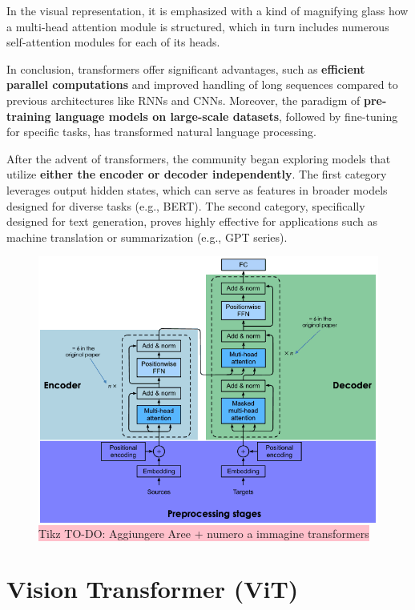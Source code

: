 In the visual representation, it is emphasized with a kind of magnifying glass how a multi-head attention module is structured, which in turn includes numerous self-attention modules for each of its heads.

In conclusion, transformers offer significant advantages, such as \textbf{efficient parallel computations} and improved handling of long sequences compared to previous architectures like RNNs and CNNs. Moreover, the paradigm of \textbf{pre-training language models on large-scale datasets}, followed by fine-tuning for specific tasks, has transformed natural language processing.

After the advent of transformers, the community began exploring models that utilize \textbf{either the encoder or decoder independently}. The first category leverages output hidden states, which can serve as features in broader models designed for diverse tasks (e.g., BERT). The second category, specifically designed for text generation, proves highly effective for applications such as machine translation or summarization (e.g., GPT series).

\begin{figure}[!htbp]
    \centering
    \includegraphics[width=0.85\linewidth]{tikz/AGGIUNGI A IMMAGINE TRANSFORMERS.png}
    \caption{{\color{red}\colorbox{pink}{Tikz TO-DO: Aggiungere Aree + numero a immagine transformers}}}
\end{figure}

\section{Vision Transformer (ViT)}



